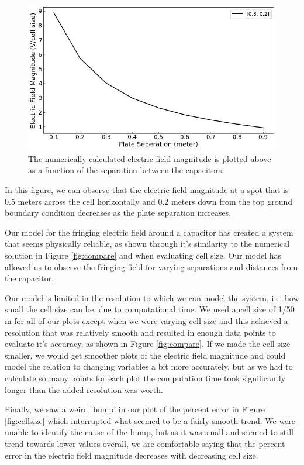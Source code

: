 \documentclass{report}
\begin{document}
            \begin{figure}[h]
                \centering
                \includegraphics[width=0.66\linewidth]{images/FringeChangingSep.png}
                \caption{The numerically calculated electric field magnitude is plotted above as a function of the separation between the capacitors.}
                \label{fig:sep}
            \end{figure}
            
            In this figure, we can observe that the electric field magnitude at a spot that is 0.5 meters across the cell horizontally and 0.2 meters down from the top ground boundary condition decreases as the plate separation increases.
        
            Our model for the fringing electric field around a capacitor has created a system that seems physically reliable, as shown through it's similarity to the numerical solution in Figure \ref{fig:compare} and when evaluating cell size. Our model has allowed us to observe the fringing field for varying separations and distances from the capacitor. 
            
            Our model is limited in the resolution to which we can model the system, i.e. how small the cell size can be, due to computational time. We used a cell size of 1/50 m for all of our plots except when we were varying cell size and this achieved a resolution that was relatively smooth and resulted in enough data points to evaluate it's accuracy, as shown in Figure \ref{fig:compare}. If we made the cell size smaller, we would get smoother plots of the electric field magnitude and could model the relation to changing variables a bit more accurately, but as we had to calculate so many points for each plot the computation time took significantly longer than the added resolution was worth.
            
            Finally, we saw a weird 'bump' in our plot of the percent error in Figure \ref{fig:cellsize} which interrupted what seemed to be a fairly smooth trend. We were unable to identify the cause of the bump, but as it was small and seemed to still trend towards lower values overall, we are comfortable saying that the percent error in the electric field magnitude decreases with decreasing cell size.
\end{document}

